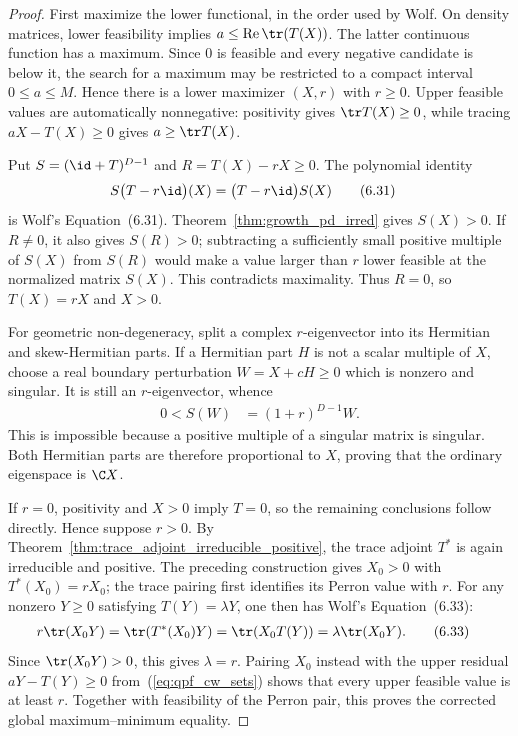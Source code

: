\begin{proof}\leanok
    First maximize the lower functional, in the order used by Wolf. On density
    matrices, lower feasibility implies
    $a\leq\operatorname{Re}\tr(T(X))$. The latter continuous function has a
    maximum. Since $0$ is feasible and every negative candidate is below it,
    the search for a maximum may be restricted to a compact interval
    $0\leq a\leq M$. Hence there is a lower maximizer $(X,r)$ with $r\geq0$.
    Upper feasible values are automatically nonnegative: positivity gives
    $\tr T(X)\geq0$, while tracing $aX-T(X)\geq0$ gives
    $a\geq\tr T(X)$.

    Put $S=(\id+T)^{D-1}$ and $R=T(X)-rX\geq0$. The polynomial identity
    \begin{align}
        S\bigl(T-r\id\bigr)(X)
        &=\bigl(T-r\id\bigr)S(X)
        \tag{6.31}\label{eq:qpf_cw_commutation}
    \end{align}
    is Wolf's Equation~(6.31). Theorem~\ref{thm:growth_pd_irred} gives
    $S(X)>0$. If $R\neq0$, it also gives $S(R)>0$; subtracting a sufficiently
    small positive multiple of $S(X)$ from $S(R)$ would make a value larger
    than $r$ lower feasible at the normalized matrix $S(X)$. This contradicts
    maximality. Thus $R=0$, so $T(X)=rX$ and $X>0$.

    For geometric non-degeneracy, split a complex $r$-eigenvector into its
    Hermitian and skew-Hermitian parts. If a Hermitian part $H$ is not a
    scalar multiple of $X$, choose a real boundary perturbation
    $W=X+cH\geq0$ which is nonzero and singular. It is still an
    $r$-eigenvector, whence
    \begin{align}
        0<S(W)
        &=(1+r)^{D-1}W.
        \tag{6.32}\label{eq:qpf_cw_boundary}
    \end{align}
    This is impossible because a positive multiple of a singular matrix is
    singular. Both Hermitian parts are therefore proportional to $X$, proving
    that the ordinary eigenspace is $\C X$.

    If $r=0$, positivity and $X>0$ imply $T=0$, so the remaining conclusions
    follow directly. Hence suppose $r>0$. By
    Theorem~\ref{thm:trace_adjoint_irreducible_positive}, the trace adjoint
    $T^*$ is again irreducible and positive. The preceding construction gives
    $X_0>0$ with $T^*(X_0)=rX_0$; the trace pairing first identifies its
    Perron value with $r$. For any nonzero $Y\geq0$ satisfying
    $T(Y)=\lambda Y$, one then has Wolf's Equation~(6.33):
    \begin{align}
        r\tr(X_0Y)
        &=\tr\!\left(T^*(X_0)Y\right)
         =\tr\!\left(X_0T(Y)\right)
         =\lambda\tr(X_0Y).
        \tag{6.33}\label{eq:qpf_cw_trace_pairing}
    \end{align}
    Since $\tr(X_0Y)>0$, this gives $\lambda=r$. Pairing $X_0$ instead with
    the upper residual $aY-T(Y)\geq0$ from~(\ref{eq:qpf_cw_sets}) shows that
    every upper feasible value is at least $r$. Together with feasibility of
    the Perron pair, this proves the corrected global maximum--minimum
    equality.


\end{proof}
